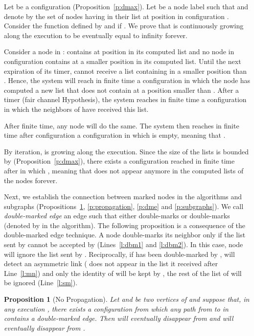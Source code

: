 \documentclass[11pt,english]{article}
\newtheorem{proposition}{Proposition}
\newenvironment{proof}[1][0cm]{
  \begin{list}{\bf Proof.~}{
      \setlength{\itemindent}{0cm}
      \setlength{\labelsep}{0cm}
      \setlength{\labelwidth}{#1}
      \setlength{\leftmargin}{#1}
    \item
    }
}{\hfill
  \end{list}
}
\begin{document}
\begin{proof}
Let  be a configuration (Proposition~\ref{p:dmax}).
Let  be a node label such that  and denote by  the set of
nodes having  in their list at position  in configuration .  Consider
the function  defined by  and  if . We prove that  is continuously growing along the execution to
be eventually equal to infinity forever.

Consider a node  in :  contains  at position
 in its computed list and no node in configuration  contains 
at a smaller position in its computed list. Until the next expiration of its
timer,  cannot receive a list containing  in a smaller position than
.
Hence, the system will reach in finite time a configuration in which the node
 has computed a new list that does not contain  at a position smaller than
. After a timer (fair channel Hypothesis), the system reaches in
finite time a configuration in which the neighbors of  have received this
list.

After finite time, any node  will do the same. The system
then reaches in finite time after configuration  a configuration  in
which  is empty, meaning that .

By iteration,  is growing along the execution.  Since the size of the
lists is bounded by  (Proposition~\ref{p:dmax}), there exists a
configuration  reached in finite time after  in which , meaning that  does not appear anymore in the computed lists of the
nodes forever.
\end{proof}




Next, we establish the connection between marked nodes in the algorithms and
subgraphs (Propositions~\ref{p:nopropagation}, \ref{p:propagation}, \ref{p:dme}
and \ref{p:subgraphs}).
We call \emph{double-marked edge} an edge  such that either 
double-marks  or  double-marks  (denoted by 
in the algorithm).  The following proposition is a consequence of the
double-marked edge technique. A node  double-marks its neighbor  only if
the list sent by  cannot be accepted by  (Lines~\ref{l:dbm1} and
\ref{l:dbm2}). In this case, node  will ignore the list sent by
. Reciprocally, if  has been double-marked by ,  will detect an
asymmetric link ( does not appear in the list it received after
Line~\ref{l:mn}) and only the identity of  will be kept by , the rest of
the list of  will be ignored (Line~\ref{l:sm}).

\begin{proposition}[No Propagation]\label{p:nopropagation}
  Let  and  be two vertices of  and suppose that, in any execution ,
  there exists a configuration  from which any path from  to  in 
  contains a double-marked edge. Then  will eventually disappear from
   and  will eventually disappear from .
\end{proposition}
\end{document}
